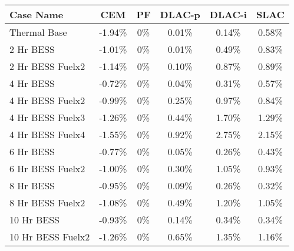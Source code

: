 \begin{tabular}{lccccc}
\toprule
Case Name & CEM & PF & DLAC-p & DLAC-i & SLAC \\
\midrule
Thermal Base & -1.94\% & 0\% & 0.01\% & 0.14\% & 0.58\% \\
2 Hr BESS & -1.01\% & 0\% & 0.01\% & 0.49\% & 0.83\% \\
2 Hr BESS Fuelx2 & -1.14\% & 0\% & 0.10\% & 0.87\% & 0.89\% \\
4 Hr BESS & -0.72\% & 0\% & 0.04\% & 0.31\% & 0.57\% \\
4 Hr BESS Fuelx2 & -0.99\% & 0\% & 0.25\% & 0.97\% & 0.84\% \\
4 Hr BESS Fuelx3 & -1.26\% & 0\% & 0.44\% & 1.70\% & 1.29\% \\
4 Hr BESS Fuelx4 & -1.55\% & 0\% & 0.92\% & 2.75\% & 2.15\% \\
6 Hr BESS & -0.77\% & 0\% & 0.05\% & 0.26\% & 0.43\% \\
6 Hr BESS Fuelx2 & -1.00\% & 0\% & 0.30\% & 1.05\% & 0.93\% \\
8 Hr BESS & -0.95\% & 0\% & 0.09\% & 0.26\% & 0.32\% \\
8 Hr BESS Fuelx2 & -1.08\% & 0\% & 0.49\% & 1.20\% & 1.05\% \\
10 Hr BESS & -0.93\% & 0\% & 0.14\% & 0.34\% & 0.34\% \\
10 Hr BESS Fuelx2 & -1.26\% & 0\% & 0.65\% & 1.35\% & 1.16\% \\
\bottomrule
\end{tabular}
